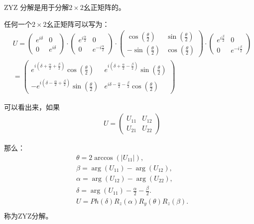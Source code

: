 ZYZ 分解是用于分解$2\times 2$幺正矩阵的。~\cite{ZYZDecompose}

任何一个$2\times 2$幺正矩阵可以写为：
\begin{equation}
\begin{split}
&U=\begin{pmatrix}e^{i\delta} & 0 \\ 0 & e^{i\delta} \end{pmatrix}\cdot 
\begin{pmatrix}e^{i\frac{\alpha}{2}} & 0 \\ 0 & e^{-i\frac{\alpha}{2}} \end{pmatrix}\cdot 
\begin{pmatrix}\cos(\frac{\theta}{2}) & \sin(\frac{\theta}{2}) \\ -\sin(\frac{\theta}{2}) & \cos(\frac{\theta}{2}) \end{pmatrix}\cdot 
\begin{pmatrix}e^{i\frac{\beta}{2}} & 0 \\ 0 & e^{-i\frac{\beta}{2}} \end{pmatrix}\\
&=\begin{pmatrix}e^{i(\delta+\frac{\alpha}{2}+\frac{\beta}{2})}\cos(\frac{\theta}{2}) & e^{i(\delta+\frac{\alpha}{2}-\frac{\beta}{2})}\sin(\frac{\theta}{2}) \\ -e^{i(\delta-\frac{\alpha}{2}+\frac{\beta}{2})}\sin(\frac{\theta}{2}) & e^{i\delta-\frac{\alpha}{2}-\frac{\beta}{2}}\cos(\frac{\theta}{2}) \end{pmatrix}
\end{split}
\end{equation}

可以看出来，如果
\begin{equation}
\begin{split}
&U=\begin{pmatrix}U_{11} & U_{12} \\ U_{21} & U_{22} \end{pmatrix}
\end{split}
\end{equation}

那么：
\begin{equation}
\begin{split}
&\theta = 2 \arccos(|U_{11}|),\\
&\beta = \arg (U_{11}) - \arg (U_{12}),\\
&\alpha = \arg (U_{12}) - \arg (U_{22}),\\
&\delta = \arg(U_{11})-\frac{\alpha}{2}-\frac{\beta}{2}.\\
&U=Ph(\delta) R_z(\alpha) R_y(\theta) R_z(\beta).\\
\end{split}
\end{equation}
称为ZYZ分解。

